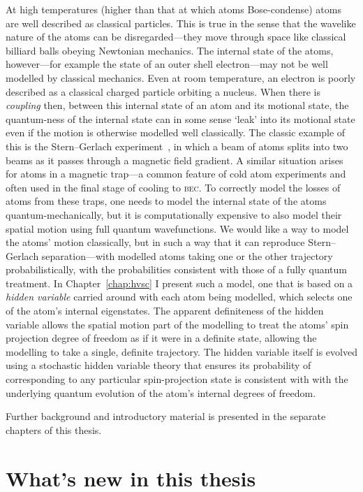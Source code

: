 At high temperatures (higher than that at which atoms Bose-condense) atoms are well described as classical particles. This is true in the sense that the wavelike nature of the atoms can be disregarded---they move through space like classical billiard balls obeying Newtonian mechanics. The internal state of the atoms, however---for example the state of an outer shell electron---may not be well modelled by classical mechanics. Even at room temperature, an electron is poorly described as a classical charged particle orbiting a nucleus. When there is \emph{coupling} then, between this internal state of an atom and its motional state, the quantum-ness of the internal state can in some sense `leak' into its motional state even if the motion is otherwise modelled well classically. The classic example of this is the Stern--Gerlach experiment~\cite{gerlach_experimentelle_1922}, in which a beam of atoms splits into two beams as it passes through a magnetic field gradient. A similar situation arises for atoms in a magnetic trap---a common feature of cold atom experiments and often used in the final stage of cooling to \textsc{bec}. To correctly model the losses of atoms from these traps, one needs to model the internal state of the atoms quantum-mechanically, but it is computationally expensive to also model their spatial motion using full quantum wavefunctions. We would like a way to model the atoms' motion classically, but in such a way that it can reproduce Stern--Gerlach separation---with modelled atoms taking one or the other trajectory probabilistically, with the probabilities consistent with those of a fully quantum treatment. In Chapter~\ref{chap:hvsc} I present such a model, one that is based on a \emph{hidden variable} carried around with each atom being modelled, which selects one of the atom's internal eigenstates. The apparent definiteness of the hidden variable allows the spatial motion part of the modelling to treat the atoms' spin projection degree of freedom as if it were in a definite state, allowing the modelling to take a single, definite trajectory. The hidden variable itself is evolved using a stochastic hidden variable theory that ensures its probability of corresponding to any particular spin-projection state is consistent with with the underlying quantum evolution of the atom's internal degrees of freedom.

Further background and introductory material is presented in the separate chapters of this thesis.

\section{What's new in this thesis}

